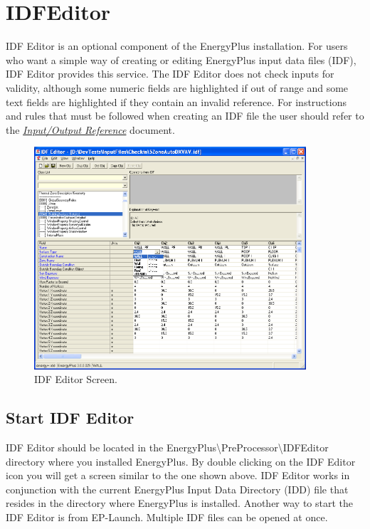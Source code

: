 \section{IDFEditor}\label{idfeditor}

IDF Editor is an optional component of the EnergyPlus installation. For users who want a simple way of creating or editing EnergyPlus input data files (IDF), IDF Editor provides this service. The IDF Editor does not check inputs for validity, although some numeric fields are highlighted if out of range and some text fields are highlighted if they contain an invalid reference. For instructions and rules that must be followed when creating an IDF file the user should refer to the \href{../../EnergyPlusFromStarTeam/EnergyPlusFromStarTeam/Documentation/sources/InputOutputReference.pdf}{\emph{Input/Output Reference}} document.

\begin{figure}[hbtp] %
\centering
\includegraphics[width=0.9\textwidth, height=0.9\textheight, keepaspectratio=true]{media/image115.png}
\caption{IDF Editor Screen. \protect \label{fig:idf-editor-screen.}}
\end{figure}

\subsection{Start IDF Editor}\label{start-idf-editor}

IDF Editor should be located in the EnergyPlus\textbackslash{}PreProcessor\textbackslash{}IDFEditor directory where you installed EnergyPlus. By double clicking on the IDF Editor icon you will get a screen similar to the one shown above. IDF Editor works in conjunction with the current EnergyPlus Input Data Directory (IDD) file that resides in the directory where EnergyPlus is installed. Another way to start the IDF Editor is from EP-Launch. Multiple IDF files can be opened at once.


